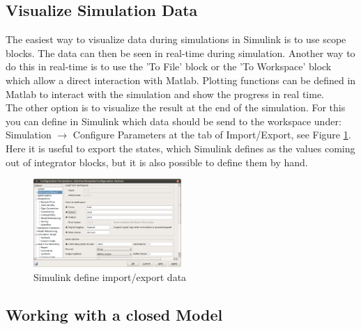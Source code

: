 \documentclass[a4paper,twoside, openright,12pt]{report}
\begin{document}
\subsection{Visualize Simulation Data}

The easiest way to visualize data during simulations in Simulink is to use scope blocks. The data can then be seen in real-time during simulation.
Another way to do this in real-time is to use the 'To File' block or the 'To Workspace' block which allow a direct interaction with Matlab. Plotting functions can be defined in Matlab to interact with the simulation
and show the progress in real time.
\\

The other option is to visualize the result at the end of the simulation. For this you can define in Simulink which data should be send to the workspace under:
Simulation $\rightarrow$ Configure Parameters at the tab of Import/Export, see Figure \ref{simulink2Fig}. Here it is useful to export the states, which Simulink defines as the 
values coming out of integrator blocks, but it is also possible to define them by hand.

\begin{figure}[htb]
\centering
\includegraphics[width=0.5\textwidth]{pics/screenSim2.eps}
\caption[Simulink define import/export data]{Simulink define import/export data}
\label{simulink2Fig}
\end{figure} 

\subsection{Working with a closed Model}
\end{document}
